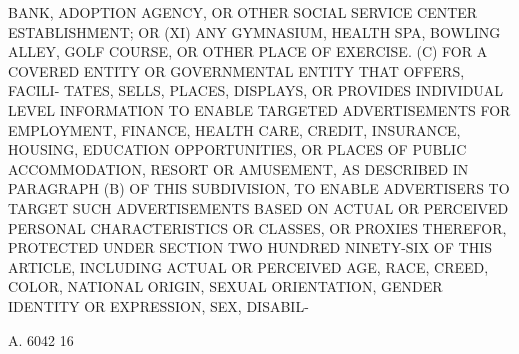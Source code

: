  BANK, ADOPTION AGENCY, OR OTHER SOCIAL SERVICE CENTER ESTABLISHMENT; OR
   (XI) ANY GYMNASIUM, HEALTH SPA, BOWLING ALLEY, GOLF COURSE,  OR  OTHER
 PLACE OF EXERCISE.
   (C)  FOR  A COVERED ENTITY OR GOVERNMENTAL ENTITY THAT OFFERS, FACILI-
 TATES, SELLS, PLACES, DISPLAYS, OR PROVIDES INDIVIDUAL LEVEL INFORMATION
 TO ENABLE TARGETED ADVERTISEMENTS FOR EMPLOYMENT, FINANCE, HEALTH  CARE,
 CREDIT, INSURANCE, HOUSING, EDUCATION OPPORTUNITIES, OR PLACES OF PUBLIC
 ACCOMMODATION,  RESORT  OR  AMUSEMENT,  AS DESCRIBED IN PARAGRAPH (B) OF
 THIS SUBDIVISION, TO ENABLE ADVERTISERS TO  TARGET  SUCH  ADVERTISEMENTS
 BASED  ON  ACTUAL  OR  PERCEIVED PERSONAL CHARACTERISTICS OR CLASSES, OR
 PROXIES THEREFOR, PROTECTED UNDER SECTION TWO HUNDRED NINETY-SIX OF THIS
 ARTICLE, INCLUDING ACTUAL OR PERCEIVED AGE, RACE, CREED, COLOR, NATIONAL
 ORIGIN, SEXUAL ORIENTATION, GENDER IDENTITY OR EXPRESSION, SEX, DISABIL-

 A. 6042                            16

